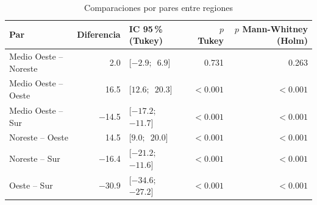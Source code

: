 \begin{table}[htbp]
\centering
\small
\caption{Comparaciones por pares entre regiones}\label{tab:pares}
\begin{tabular}{l r l r r}
\toprule
Par & Diferencia & IC 95\,\% (Tukey) & $p$ Tukey & $p$ Mann-Whitney (Holm) \\
\midrule
Medio Oeste -- Noreste & \num{2.0} & $[\num{-2.9};$\allowbreak\ $\num{6.9}]$ & \num{0.731} & \num{0.263} \\
Medio Oeste -- Oeste & \num{16.5} & $[\num{12.6};$\allowbreak\ $\num{20.3}]$ & $<\num{0.001}$ & $<\num{0.001}$ \\
Medio Oeste -- Sur & \num{-14.5} & $[\num{-17.2};$\allowbreak\ $\num{-11.7}]$ & $<\num{0.001}$ & $<\num{0.001}$ \\
Noreste -- Oeste & \num{14.5} & $[\num{9.0};$\allowbreak\ $\num{20.0}]$ & $<\num{0.001}$ & $<\num{0.001}$ \\
Noreste -- Sur & \num{-16.4} & $[\num{-21.2};$\allowbreak\ $\num{-11.6}]$ & $<\num{0.001}$ & $<\num{0.001}$ \\
Oeste -- Sur & \num{-30.9} & $[\num{-34.6};$\allowbreak\ $\num{-27.2}]$ & $<\num{0.001}$ & $<\num{0.001}$ \\
\bottomrule
\end{tabular}

\end{table}
